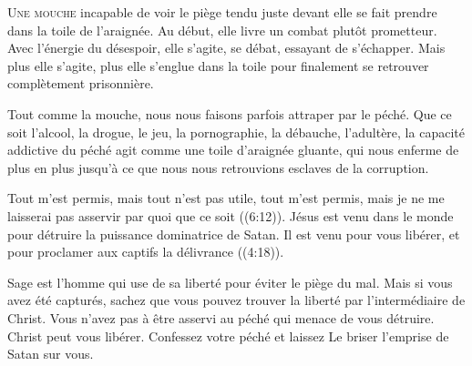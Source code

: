 

\lettrine{U}{ne mouche}
 \ocadr incapable de voir le piège tendu juste devant elle \fcadr{}
 se fait prendre dans la toile de l'araignée.
 Au début, elle livre un combat plutôt prometteur.
 Avec l'énergie du désespoir, elle s'agite, se débat,
 essayant de s'échapper.
 Mais plus elle s'agite, plus elle s'englue dans la toile
 pour finalement se retrouver complètement prisonnière. 

Tout comme la mouche, nous nous faisons parfois attraper
 par le péché.
 Que ce soit l'alcool, la drogue, le jeu, la pornographie,
 la débauche, l'adultère, la capacité addictive du péché
 agit comme une toile d'araignée gluante, qui nous enferme
 de plus en plus jusqu'à ce que nous nous retrouvions
 esclaves de la corruption. 


\Og Tout m'est permis, mais tout n'est pas utile,
 tout m'est permis, mais je ne me laisserai pas asservir
 par quoi que ce soit \Fg{} ((6:12)).
 Jésus est venu dans le monde pour détruire
 la puissance dominatrice de Satan.
 Il est venu pour vous libérer,
 et \Og pour proclamer aux captifs la délivrance \Fg{} ((4:18)).

Sage est l'homme qui use de sa liberté pour éviter le piège du mal.
 Mais si vous avez été capturés, sachez que vous pouvez trouver la liberté
 par l'intermédiaire de Christ.
 Vous n'avez pas à être asservi au péché qui menace de vous détruire.
 Christ peut vous libérer. Confessez votre péché et laissez Le briser
 l'emprise de Satan sur vous. 

\dvrule






